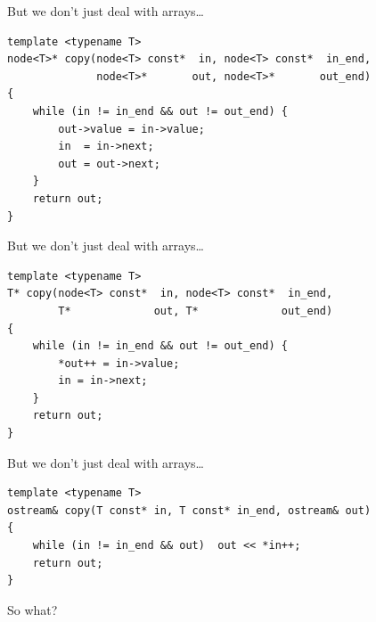 \documentclass[aspectratio=169]{beamer}
\begin{document}

\begin{frame}[fragile]{But we don't just deal with arrays\dots}
  \small
\begin{lstlisting}
template <typename T>
node<T>* copy(node<T> const*  in, node<T> const*  in_end,
              node<T>*       out, node<T>*       out_end)
{
    while (in != in_end && out != out_end) {
        out->value = in->value;
        in  = in->next;
        out = out->next;
    }
    return out;
}
\end{lstlisting}
\end{frame}


\begin{frame}[fragile]{But we don't just deal with arrays\dots}
  \small
\begin{lstlisting}
template <typename T>
T* copy(node<T> const*  in, node<T> const*  in_end,
        T*             out, T*             out_end)
{
    while (in != in_end && out != out_end) {
        *out++ = in->value;
        in = in->next;
    }
    return out;
}
\end{lstlisting}
\end{frame}


\begin{frame}[fragile]{But we don't just deal with arrays\dots}
  \small
\begin{lstlisting}
template <typename T>
ostream& copy(T const* in, T const* in_end, ostream& out)
{
    while (in != in_end && out)  out << *in++;
    return out;
}
\end{lstlisting}
\end{frame}


\begin{frame}[standout]
  So what?
\end{frame}

\end{document}
